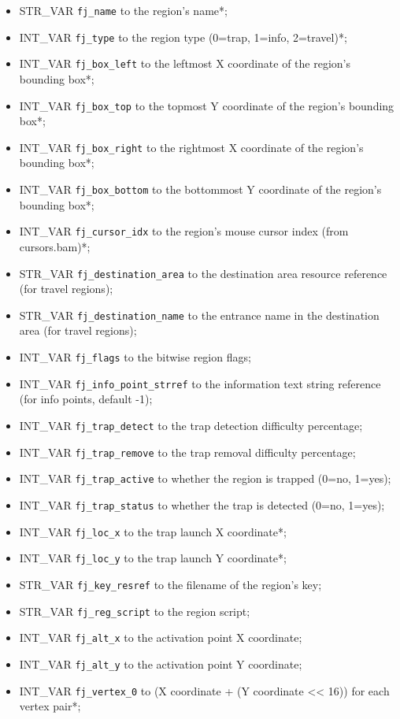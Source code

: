 \documentclass{article}
\begin{document}
\begin{itemize}
\item STR_VAR \verb+fj_name+ to the region's name*;
\item INT_VAR \verb+fj_type+ to the region type (0=trap, 1=info, 2=travel)*;
\item INT_VAR \verb+fj_box_left+ to the leftmost X coordinate of the region's bounding box*;
\item INT_VAR \verb+fj_box_top+ to the topmost Y coordinate of the region's bounding box*;
\item INT_VAR \verb+fj_box_right+ to the rightmost X coordinate of the region's bounding box*;
\item INT_VAR \verb+fj_box_bottom+ to the bottommost Y coordinate of the region's bounding box*;
\item INT_VAR \verb+fj_cursor_idx+ to the region's mouse cursor index (from cursors.bam)*;
\item STR_VAR \verb+fj_destination_area+ to the destination area resource reference (for travel regions);
\item STR_VAR \verb+fj_destination_name+ to the entrance name in the destination area (for travel regions);
\item INT_VAR \verb+fj_flags+ to the bitwise region flags;
\item INT_VAR \verb+fj_info_point_strref+ to the information text string reference (for info points, default -1);
\item INT_VAR \verb+fj_trap_detect+ to the trap detection difficulty percentage;
\item INT_VAR \verb+fj_trap_remove+ to the trap removal difficulty percentage;
\item INT_VAR \verb+fj_trap_active+ to whether the region is trapped (0=no, 1=yes);
\item INT_VAR \verb+fj_trap_status+ to whether the trap is detected (0=no, 1=yes);
\item INT_VAR \verb+fj_loc_x+ to the trap launch X coordinate*;
\item INT_VAR \verb+fj_loc_y+ to the trap launch Y coordinate*;
\item STR_VAR \verb+fj_key_resref+ to the filename of the region's key;
\item STR_VAR \verb+fj_reg_script+ to the region script;
\item INT_VAR \verb+fj_alt_x+ to the activation point X coordinate;
\item INT_VAR \verb+fj_alt_y+ to the activation point Y coordinate;
\item INT_VAR \verb+fj_vertex_0+ to (X coordinate + (Y coordinate << 16)) for each vertex pair*;
\end{itemize}
\end{document}
